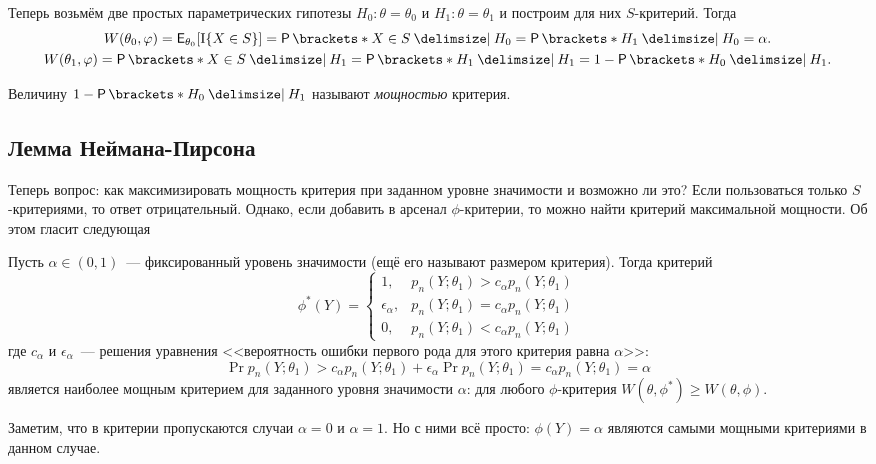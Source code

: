 Теперь возьмём две простых параметрических гипотезы \(H_{0} : \theta = 
\theta_{0}\) и \(H_{1} : \theta = \theta_{1}\) и построим для них 
\(S\)-критерий. Тогда
\begin{gather*}
	W(\theta_{0}, \phi) = \E_{\theta_{0}}[\I\{X \in S\}] = \Pr{X \in S \given 
	H_{0}} = \Pr{H_{1} \given H_{0}} = \alpha. \\
	W(\theta_{1}, \phi) = \Pr{X \in S \given H_{1}} = \Pr{H_{1} \given H_{1}} = 
	1 - \Pr{H_{0} \given H_{1}}.
\end{gather*}

Величину \(1 - \Pr{H_{0} \given H_{1}}\) называют \emph{мощностью} критерия. 

\subsection{Лемма Неймана-Пирсона}
Теперь вопрос: как максимизировать мощность критерия при заданном уровне 
значимости и возможно ли это? Если пользоваться только \(S\)-критериями, то 
ответ отрицательный. Однако, если добавить в арсенал \(\phi\)-критерии, то 
можно найти критерий максимальной мощности. Об этом гласит следующая
\begin{lemma}
	Пусть \(\alpha \in (0, 1)\)~--- фиксированный уровень значимости (ещё его 
	называют размером критерия). Тогда критерий
	\[
		\phi^{*}(Y) = \begin{cases}
		1,& p_{n}(Y; \theta_{1}) > c_{\alpha}p_{n}(Y; \theta_{1}) \\
		\epsilon_{\alpha},& p_{n}(Y; \theta_{1}) = c_{\alpha}p_{n}(Y; 
		\theta_{1}) \\
		0,& p_{n}(Y; \theta_{1}) < c_{\alpha}p_{n}(Y; \theta_{1})
		\end{cases}
	\]
	где \(c_{\alpha}\) и \(\epsilon_{\alpha}\)~--- решения уравнения 
	<<вероятность ошибки первого рода для этого критерия равна \(\alpha\)>>: 
	\[
		\Pr{p_{n}(Y; \theta_{1}) > c_{\alpha}p_{n}(Y; \theta_{1})} + 
		\epsilon_{\alpha}\Pr{p_{n}(Y; \theta_{1}) = c_{\alpha}p_{n}(Y; 
		\theta_{1})} = \alpha
	\]
	является наиболее мощным критерием для заданного уровня значимости 
	\(\alpha\): для любого \(\phi\)-критерия \(W(\theta, \phi^{*}) \geq 
	W(\theta, \phi)\).
\end{lemma}

Заметим, что в критерии пропускаются случаи \(\alpha = 0\) и \(\alpha = 1\). Но 
с ними всё просто: \(\phi(Y) = \alpha\) являются самыми мощными критериями в 
данном случае.

